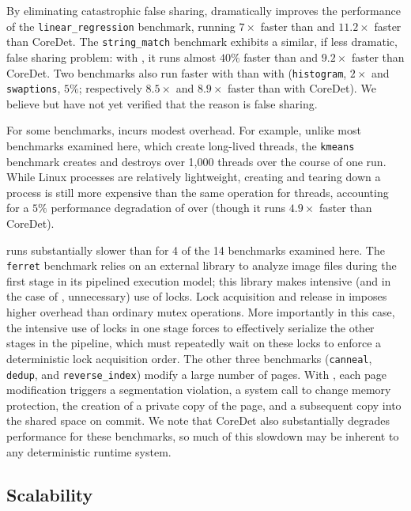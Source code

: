 By eliminating catastrophic false sharing, \dthreads{} dramatically
improves the performance of the \texttt{linear\_regression} benchmark,
running $7\times$ faster than \pthreads{} and $11.2\times$ faster than
CoreDet. The \texttt{string\_match} benchmark exhibits a similar, if
less dramatic, false sharing problem: with \dthreads{}, it runs almost
$40\%$ faster than \pthreads{} and $9.2\times$ faster than CoreDet. Two
benchmarks also run faster with \dthreads{} than with \pthreads{}
(\texttt{histogram}, $2\times$ and \texttt{swaptions}, $5\%$;
respectively $8.5\times$ and $8.9\times$ faster than with CoreDet). We
believe but have not yet verified that the reason is false sharing.

For some benchmarks, \dthreads{} incurs modest overhead. For example,
unlike most benchmarks examined here, which create long-lived threads,
the
\texttt{kmeans} benchmark creates and destroys over 1,000 threads over the course of one run.
While Linux processes are relatively lightweight, creating and tearing
down a process is still more expensive than the same operation for
threads, accounting for a $5\%$ performance degradation of \dthreads{}
over \pthreads{} (though it runs $4.9\times$ faster than CoreDet).

\dthreads{} runs substantially slower than \pthreads{} for 4 of the 14
benchmarks examined here. The \texttt{ferret} benchmark relies on an
external library to analyze image files during the first stage in its
pipelined execution model; this library makes intensive (and in the
case of \dthreads{}, unnecessary) use of locks. Lock acquisition and
release in \dthreads{} imposes higher overhead than
ordinary \pthreads{} mutex operations. More importantly in this case,
the intensive use of locks in one stage forces \dthreads{} to
effectively serialize the other stages in the pipeline, which must
repeatedly wait on these locks to enforce a deterministic lock
acquisition order. The other three benchmarks
(\texttt{canneal}, \texttt{dedup}, and \texttt{reverse\_index}) modify
a large number of pages. With \dthreads{}, each page modification
triggers a segmentation violation, a system call to change memory
protection, the creation of a private copy of the page, and a
subsequent copy into the shared space on commit. We note that CoreDet
also substantially degrades performance for these benchmarks, so much
of this slowdown may be inherent to any deterministic runtime system.

\subsection{Scalability}


